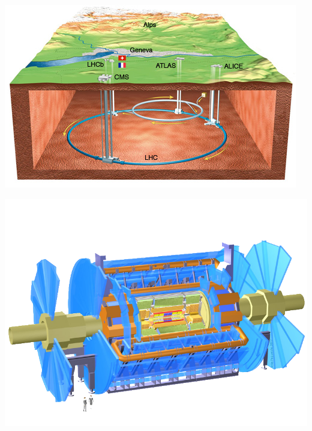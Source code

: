 \begin{minipagewithmarginpars}[h]{\textwidth}
  	\centering
	\includegraphics[scale=0.6]{LHC/CERNMap.jpg}
  	\label{lhcschema}
  	\par 	
\marginpar
{
	\includegraphics[width=\marginparwidth]{LHC/atlas.png}
    	\label{atlas}
}
\end{minipagewithmarginpars}

